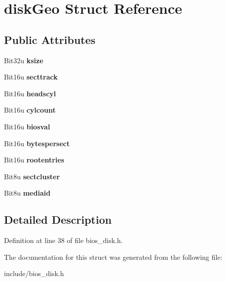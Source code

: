 \hypertarget{structdiskGeo}{\section{disk\-Geo Struct Reference}
\label{structdiskGeo}
}
\subsection*{Public Attributes}
\begin{DoxyCompactItemize}
\item 
\hypertarget{structdiskGeo_abd4f3a12080100ef6625fee835a73f67}{Bit32u {\bfseries ksize}}\label{structdiskGeo_abd4f3a12080100ef6625fee835a73f67}

\item 
\hypertarget{structdiskGeo_a429b8096124fd210c60176218062bea7}{Bit16u {\bfseries secttrack}}\label{structdiskGeo_a429b8096124fd210c60176218062bea7}

\item 
\hypertarget{structdiskGeo_a80d15f791103e8609b0e4fd20b50a55c}{Bit16u {\bfseries headscyl}}\label{structdiskGeo_a80d15f791103e8609b0e4fd20b50a55c}

\item 
\hypertarget{structdiskGeo_a462ae47d0cdb78c1c504d5bd2a388b47}{Bit16u {\bfseries cylcount}}\label{structdiskGeo_a462ae47d0cdb78c1c504d5bd2a388b47}

\item 
\hypertarget{structdiskGeo_a6ebd77ebcb86a90902daa6d223de7b1b}{Bit16u {\bfseries biosval}}\label{structdiskGeo_a6ebd77ebcb86a90902daa6d223de7b1b}

\item 
\hypertarget{structdiskGeo_aab11beac3d73068f943f5bb613fa3b7d}{Bit16u {\bfseries bytespersect}}\label{structdiskGeo_aab11beac3d73068f943f5bb613fa3b7d}

\item 
\hypertarget{structdiskGeo_ab0c3a8d4109181b6907c44eaebedde85}{Bit16u {\bfseries rootentries}}\label{structdiskGeo_ab0c3a8d4109181b6907c44eaebedde85}

\item 
\hypertarget{structdiskGeo_a4bea3286e3153517df893665098a01b0}{Bit8u {\bfseries sectcluster}}\label{structdiskGeo_a4bea3286e3153517df893665098a01b0}

\item 
\hypertarget{structdiskGeo_aa6840d41ea4a20e8c7838399199797fa}{Bit8u {\bfseries mediaid}}\label{structdiskGeo_aa6840d41ea4a20e8c7838399199797fa}

\end{DoxyCompactItemize}


\subsection{Detailed Description}


Definition at line 38 of file bios\-\_\-disk.\-h.



The documentation for this struct was generated from the following file\-:\begin{DoxyCompactItemize}
\item 
include/bios\-\_\-disk.\-h\end{DoxyCompactItemize}
